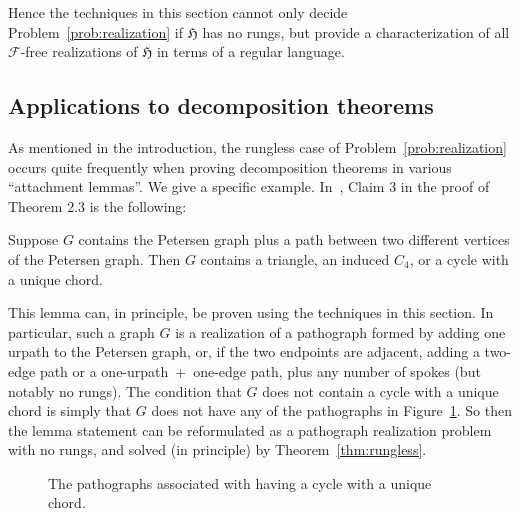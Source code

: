 \documentclass{article}
\renewcommand{\vert}[2]{\node[dot] (#1) at (#2) {};}
\newcommand{\edge}[2]{\draw (#1) -- (#2);}
\newcommand{\urpath}[2]{\draw[decorate,decoration={snake,amplitude=1.5,segment length=10, post length=0,pre length=0}] (#1) -- (#2);}
\newcommand{\Fc}{\mathcal{F}}
\newcommand{\Hf}{\mathfrak{H}}
\begin{document}
Hence the techniques in this section cannot only decide Problem~\ref{prob:realization} if $\Hf$ has no rungs, but provide a characterization of all $\Fc$-free realizations of $\Hf$ in terms of a regular language.

\subsection{Applications to decomposition theorems}
\label{ssec:decomposition}

As mentioned in the introduction, the rungless case of Problem~\ref{prob:realization} occurs quite frequently when proving decomposition theorems in various ``attachment lemmas''. We give a specific example. In~\cite{uniquechord}, Claim 3 in the proof of Theorem 2.3 is the following:

\begin{lemma}
Suppose $G$ contains the Petersen graph plus a path between two different vertices of the Petersen graph. Then $G$ contains a triangle, an induced $C_4$, or a cycle with a unique chord.
\end{lemma}

This lemma can, in principle, be proven using the techniques in this section. In particular, such a graph $G$ is a realization of a pathograph formed by adding one urpath to the Petersen graph, or, if the two endpoints are adjacent, adding a two-edge path or a one-urpath~+~one-edge path, plus any number of spokes (but notably no rungs). The condition that $G$ does not contain a cycle with a unique chord is simply that $G$ does not have any of the pathographs in Figure~\ref{fig:uniquechord}. So then the lemma statement can be reformulated as a pathograph realization problem with no rungs, and solved (in principle) by Theorem~\ref{thm:rungless}.

\begin{figure}[htb!]
    \centering
    \qquad
    \qquad
    \caption{The pathographs associated with having a cycle with a unique chord.}
    \label{fig:uniquechord}
\end{figure}
\end{document}
